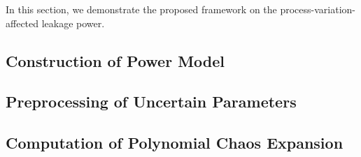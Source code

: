 In this section, we demonstrate the proposed framework on the process-variation-affected leakage power.

\subsection{Construction of Power Model} 


\subsection{Preprocessing of Uncertain Parameters} 


\subsection{Computation of Polynomial Chaos Expansion} 

